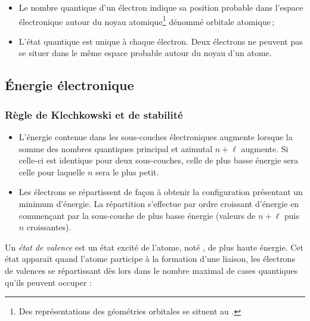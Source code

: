 \begin{itemize}
	\item Le nombre quantique d'un électron indique sa position probable dans l'espace électronique autour du noyau atomique\footnote{Des représentations des géométries orbitales se situent au .} dénommé orbitale atomique\,;
	\item L'état quantique est unique à chaque électron. Deux électrons ne peuvent pas se situer dans le même espace probable autour du noyau d'un atome.
\end{itemize}

\pagebreak

\pagebreak



\subsection{\'Energie électronique}

\subsubsection{Règle de Klechkowski et de stabilité}
\begin{itemize}
	\item L'énergie contenue dans les sous-couches électroniques augmente lorsque la somme des nombres quantiques principal et azimutal $n + \ell$ augmente. Si celle-ci est identique pour deux sous-couches, celle de plus basse énergie sera celle pour laquelle $n$ sera le plus petit.
	\item Les électrons se répartissent de façon à obtenir la configuration présentant un minimum d'énergie. La répartition s'effectue par ordre croissant d'énergie en commençant par la sous-couche de plus basse énergie (valeurs de $n + \ell$ puis $n$ croissantes).
\end{itemize}
Un \emph{état de valence} est un état excité de l'atome, noté \og * \fg{}, de plus haute énergie. Cet état apparait quand l'atome participe à la formation d'une liaison, les électrons de valences se répartissant dès lors dans le nombre maximal de cases quantiques qu'ils peuvent occuper :

